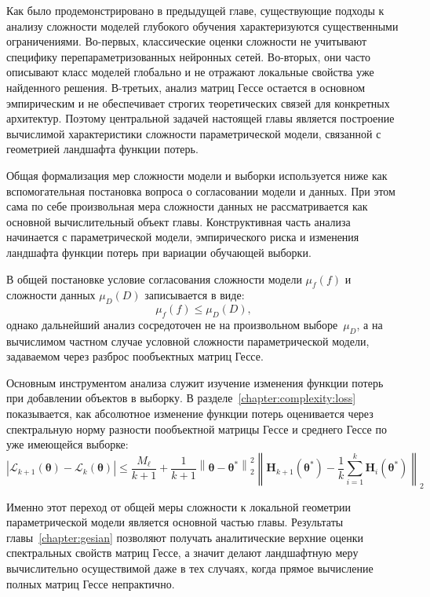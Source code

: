 Как было продемонстрировано в предыдущей главе, существующие подходы к анализу сложности моделей глубокого обучения характеризуются существенными ограничениями. Во-первых, классические оценки сложности не учитывают специфику перепараметризованных нейронных сетей. Во-вторых, они часто описывают класс моделей глобально и не отражают локальные свойства уже найденного решения. В-третьих, анализ матриц Гессе остается в основном эмпирическим и не обеспечивает строгих теоретических связей для конкретных архитектур. Поэтому центральной задачей настоящей главы является построение вычислимой характеристики сложности параметрической модели, связанной с геометрией ландшафта функции потерь.

Общая формализация мер сложности модели и выборки используется ниже как вспомогательная постановка вопроса о согласовании модели и данных. При этом сама по себе произвольная мера сложности данных не рассматривается как основной вычислительный объект главы. Конструктивная часть анализа начинается с параметрической модели, эмпирического риска и изменения ландшафта функции потерь при вариации обучающей выборки.

В общей постановке условие согласования сложности модели $\mu_f(f)$ и сложности данных $\mu_D(D)$ записывается в виде:
\begin{equation}
    \mu_f(f) \leq \mu_D(D),
\end{equation}
однако дальнейший анализ сосредоточен не на произвольном выборе~$\mu_D$, а на вычислимом частном случае условной сложности параметрической модели, задаваемом через разброс пообъектных матриц Гессе.

Основным инструментом анализа служит изучение изменения функции потерь при добавлении объектов в выборку. В разделе~\ref{chapter:complexity:loss} показывается, как абсолютное изменение функции потерь оценивается через спектральную норму разности пообъектной матрицы Гессе и среднего Гессе по уже имеющейся выборке:
\begin{equation}
    \left| \mathcal{L}_{k+1}(\boldsymbol{\theta}) - \mathcal{L}_k(\boldsymbol{\theta}) \right| \leqslant \frac{M_{\ell}}{k+1} + \frac{1}{k+1} \left\|\boldsymbol{\theta} - \boldsymbol{\theta}^*\right\|_2^2 \left\| \mathbf{H}_{k+1}(\boldsymbol{\theta}^*) - \frac{1}{k} \sum\limits_{i=1}^{k} \mathbf{H}_{i}(\boldsymbol{\theta}^*) \right\|_2
\end{equation}

Именно этот переход от общей меры сложности к локальной геометрии параметрической модели является основной частью главы. Результаты главы~\ref{chapter:gesian} позволяют получать аналитические верхние оценки спектральных свойств матриц Гессе, а значит делают ландшафтную меру вычислительно осуществимой даже в тех случаях, когда прямое вычисление полных матриц Гессе непрактично.

